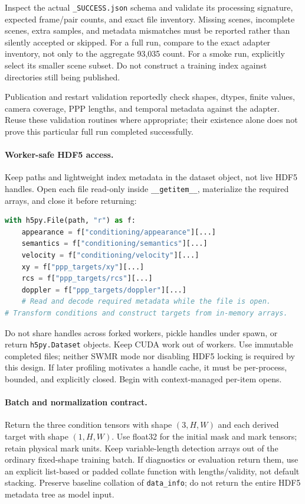\documentclass[11pt,a4paper]{article}
\begin{document}
Inspect the actual \texttt{\_SUCCESS.json} schema and validate its processing signature, expected frame/pair counts, and exact file inventory. Missing scenes, incomplete scenes, extra samples, and metadata mismatches must be reported rather than silently accepted or skipped. For a full run, compare to the exact adapter inventory, not only to the aggregate 93,035 count. For a smoke run, explicitly select its smaller scene subset. Do not construct a training index against directories still being published.

Publication and restart validation reportedly check shapes, dtypes, finite values, camera coverage, PPP lengths, and temporal metadata against the adapter. Reuse these validation routines where appropriate; their existence alone does not prove this particular full run completed successfully.

\paragraph{Worker-safe HDF5 access.}
Keep paths and lightweight index metadata in the dataset object, not live HDF5 handles. Open each file read-only inside \texttt{\_\_getitem\_\_}, materialize the required arrays, and close it before returning:
\begin{lstlisting}[language=Python]
with h5py.File(path, "r") as f:
    appearance = f["conditioning/appearance"][...]
    semantics = f["conditioning/semantics"][...]
    velocity = f["conditioning/velocity"][...]
    xy = f["ppp_targets/xy"][...]
    rcs = f["ppp_targets/rcs"][...]
    doppler = f["ppp_targets/doppler"][...]
    # Read and decode required metadata while the file is open.
# Transform conditions and construct targets from in-memory arrays.
\end{lstlisting}
Do not share handles across forked workers, pickle handles under spawn, or return \texttt{h5py.Dataset} objects. Keep CUDA work out of workers. Use immutable completed files; neither SWMR mode nor disabling HDF5 locking is required by this design. If later profiling motivates a handle cache, it must be per-process, bounded, and explicitly closed. Begin with context-managed per-item opens.

\paragraph{Batch and normalization contract.}
Return the three condition tensors with shape \((3,H,W)\) and each derived target with shape \((1,H,W)\). Use float32 for the initial mask and mark tensors; retain physical mark units. Keep variable-length detection arrays out of the ordinary fixed-shape training batch. If diagnostics or evaluation return them, use an explicit list-based or padded collate function with lengths/validity, not default stacking. Preserve baseline collation of \texttt{data\_info}; do not return the entire HDF5 metadata tree as model input.
\end{document}
